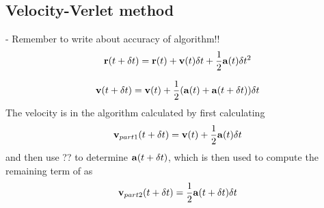 \subsection{Velocity-Verlet method}
\label{sec:methodVV}
- Remember to write about accuracy of algorithm!!
\begin{align}
	\mbox{\textbf{r}}(t+\delta t) = \mbox{\textbf{r}}(t) + \mbox{\textbf{v}} (t) \delta t + \frac{1}{2} \mbox{\textbf{a}} (t) \delta t^2 
	\label{eq:VVmethodNextPosition}
\end{align}

\begin{align}
	\mbox{\textbf{v}} (t + \delta t) = \mbox{\textbf{v}} (t) + \frac{1}{2} ( \mbox{\textbf{a}} (t) + \mbox{\textbf{a}} (t + \delta t) ) \delta t
	\label{eq:VVmethodNextVelocity}
\end{align}
The velocity is in the algorithm calculated  by first calculating 
\begin{align}
	\mbox{\textbf{v}}_{part1} (t + \delta t) = \mbox{\textbf{v}} (t) + \frac{1}{2}  \mbox{\textbf{a}} (t)  \delta t
	\label{eq:VVmethodNextVelocityPart1}
\end{align}
and then use ??  to determine $\mbox{\textbf{a}} (t + \delta t)$, which is then used to compute the remaining term of  as 
\begin{align}
	\mbox{\textbf{v}}_{part2} (t + \delta t) = \frac{1}{2} \mbox{\textbf{a}} (t + \delta t) \delta t
	\label{eq:VVmethodNextVelocityPart2}
\end{align}